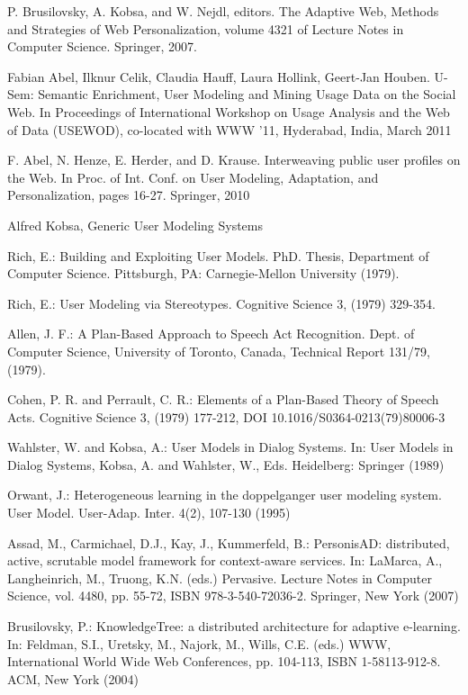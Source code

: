 \begin{thebibliography}{99}

 P. Brusilovsky, A. Kobsa, and W. Nejdl, editors. The Adaptive Web, Methods and Strategies of Web Personalization, volume 4321 of Lecture Notes in Computer Science. Springer, 2007.

 Fabian Abel, Ilknur Celik, Claudia Hauff, Laura Hollink, Geert-Jan Houben. U-Sem: Semantic Enrichment, User Modeling and Mining Usage Data on the Social Web. In Proceedings of International Workshop on Usage Analysis and the Web of Data (USEWOD), co-located with WWW '11, Hyderabad, India, March 2011

 F. Abel, N. Henze, E. Herder, and D. Krause. Interweaving public user profiles on the Web. In Proc. of Int. Conf. on User Modeling, Adaptation, and Personalization, pages 16-27. Springer, 2010

 Alfred Kobsa, Generic User Modeling Systems 

 Rich, E.: Building and Exploiting User Models. PhD. Thesis, Department of Computer Science. Pittsburgh, PA: Carnegie-Mellon University (1979). 

 Rich, E.: User Modeling via Stereotypes. Cognitive Science 3, (1979) 329-354.

 Allen, J. F.: A Plan-Based Approach to Speech Act Recognition. Dept. of Computer Science, University of Toronto, Canada, Technical Report 131/79, (1979).

 Cohen, P. R. and Perrault, C. R.: Elements of a Plan-Based Theory of Speech Acts. Cognitive Science 3, (1979) 177-212, DOI 10.1016/S0364-0213(79)80006-3

 Wahlster, W. and Kobsa, A.: User Models in Dialog Systems. In: User Models in Dialog Systems, Kobsa, A. and Wahlster, W., Eds. Heidelberg: Springer (1989)

 Orwant, J.: Heterogeneous learning in the doppelganger user modeling system. User Model. User-Adap. Inter. 4(2), 107-130 (1995)

 Assad, M., Carmichael, D.J., Kay, J., Kummerfeld, B.: PersonisAD: distributed, active, scrutable model
framework for context-aware services. In: LaMarca, A., Langheinrich, M., Truong, K.N. (eds.) Pervasive. Lecture Notes in Computer Science, vol. 4480, pp. 55-72, ISBN 978-3-540-72036-2. Springer,
New York (2007)

 Brusilovsky, P.: KnowledgeTree: a distributed architecture for adaptive e-learning. In: Feldman, S.I.,
Uretsky, M., Najork, M., Wills, C.E. (eds.) WWW, International World Wide Web Conferences,
pp. 104-113, ISBN 1-58113-912-8. ACM, New York (2004)


\end{thebibliography}
